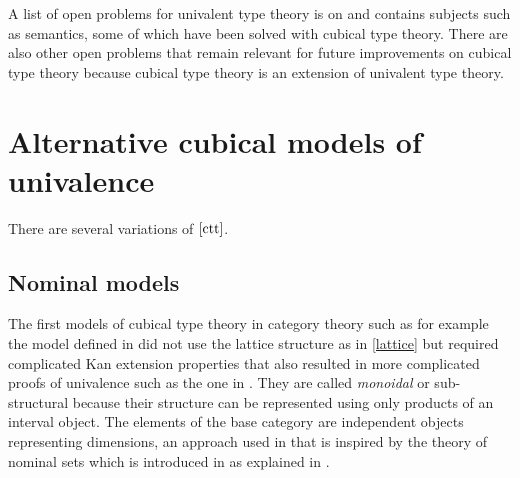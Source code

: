\documentclass[12pt,a4paper,twoside,xetex]{book}
\newcommand{\keyword}[1]{\emph{#1}\index{#1}}
\begin{document}
\begin{itemize}


\end{itemize}

A list of open problems for univalent type theory is on \cite{Awodey2019} and contains subjects such as semantics, some of which have been solved with cubical type theory. There are also other open problems that remain relevant for future improvements on cubical type theory because cubical type theory is an extension of univalent type theory.



\section{Alternative cubical models of univalence}

There are several variations of $\cref{ctt}$.

\subsection{Nominal models}\label{nominalmod}

The first models of cubical type theory in category theory such as for example the model defined in \cite{Bezem2014} did not use the lattice structure as in \cref{lattice} but required complicated Kan extension properties that also resulted in more complicated proofs of univalence such as the one in \cite{Bezem2018}. They are called \keyword{monoidal} or sub-structural because their structure can be represented using only products of an interval object. The elements of the base category are independent objects representing dimensions, an approach used in \cite{Huber2016} that is inspired by the theory of nominal sets which is introduced in \cite{Pitts:2013:NSN:2512979} as explained in \cite{Pit14}. 
\end{document}

